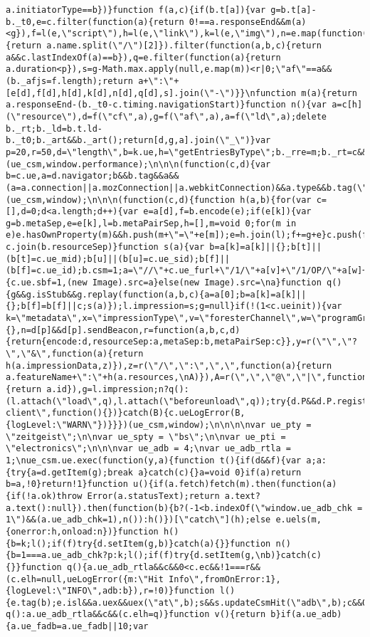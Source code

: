 \documentclass[
]{article}
\begin{document}
\begin{verbatim}
a.initiatorType==b})}function f(a,c){if(b.t[a]){var g=b.t[a]-b._t0,e=c.filter(function(a){return 0!==a.responseEnd&&m(a)<g}),f=l(e,\"script\"),h=l(e,\"link\"),k=l(e,\"img\"),n=e.map(function(a){return a.name.split(\"/\")[2]}).filter(function(a,b,c){return a&&c.lastIndexOf(a)==b}),q=e.filter(function(a){return a.duration<p}),s=g-Math.max.apply(null,e.map(m))<r|0;\"af\"==a&&(b._afjs=f.length);return a+\":\"+[e[d],f[d],h[d],k[d],n[d],q[d],s].join(\"-\")}}\nfunction m(a){return a.responseEnd-(b._t0-c.timing.navigationStart)}function n(){var a=c[h](\"resource\"),d=f(\"cf\",a),g=f(\"af\",a),a=f(\"ld\",a);delete b._rt;b._ld=b.t.ld-b._t0;b._art&&b._art();return[d,g,a].join(\"_\")}var p=20,r=50,d=\"length\",b=k.ue,h=\"getEntriesByType\";b._rre=m;b._rt=c&&c.timing&&c[h]&&n})(ue_csm,window.performance);\n\n\n(function(c,d){var b=c.ue,a=d.navigator;b&&b.tag&&a&&(a=a.connection||a.mozConnection||a.webkitConnection)&&a.type&&b.tag(\"netInfo:\"+a.type)})(ue_csm,window);\n\n\n(function(c,d){function h(a,b){for(var c=[],d=0;d<a.length;d++){var e=a[d],f=b.encode(e);if(e[k]){var g=b.metaSep,e=e[k],l=b.metaPairSep,h=[],m=void 0;for(m in e)e.hasOwnProperty(m)&&h.push(m+\"=\"+e[m]);e=h.join(l);f+=g+e}c.push(f)}return c.join(b.resourceSep)}function s(a){var b=a[k]=a[k]||{};b[t]||(b[t]=c.ue_mid);b[u]||(b[u]=c.ue_sid);b[f]||(b[f]=c.ue_id);b.csm=1;a=\"//\"+c.ue_furl+\"/1/\"+a[v]+\"/1/OP/\"+a[w]+\"/\"+a[x]+\"/\"+h([a],y);if(n)try{n.call(d[p],a)}catch(g){c.ue.sbf=1,(new Image).src=a}else(new Image).src=\na}function q(){g&&g.isStub&&g.replay(function(a,b,c){a=a[0];b=a[k]=a[k]||{};b[f]=b[f]||c;s(a)});l.impression=s;g=null}if(!(1<c.ueinit)){var k=\"metadata\",x=\"impressionType\",v=\"foresterChannel\",w=\"programGroup\",t=\"marketplaceId\",u=\"session\",f=\"requestId\",p=\"navigator\",l=c.ue||{},n=d[p]&&d[p].sendBeacon,r=function(a,b,c,d){return{encode:d,resourceSep:a,metaSep:b,metaPairSep:c}},y=r(\"\",\"?\",\"&\",function(a){return h(a.impressionData,z)}),z=r(\"/\",\":\",\",\",function(a){return a.featureName+\":\"+h(a.resources,\nA)}),A=r(\",\",\"@\",\"|\",function(a){return a.id}),g=l.impression;n?q():(l.attach(\"load\",q),l.attach(\"beforeunload\",q));try{d.P&&d.P.register&&d.P.register(\"impression-client\",function(){})}catch(B){c.ueLogError(B,{logLevel:\"WARN\"})}}})(ue_csm,window);\n\n\n\nvar ue_pty = \"zeitgeist\";\n\nvar ue_spty = \"bs\";\n\nvar ue_pti = \"electronics\";\n\n\nvar ue_adb = 4;\nvar ue_adb_rtla = 1;\nue_csm.ue.exec(function(y,a){function t(){if(d&&f){var a;a:{try{a=d.getItem(g);break a}catch(c){}a=void 0}if(a)return b=a,!0}return!1}function u(){if(a.fetch)fetch(m).then(function(a){if(!a.ok)throw Error(a.statusText);return a.text?a.text():null}).then(function(b){b?(-1<b.indexOf(\"window.ue_adb_chk = 1\")&&(a.ue_adb_chk=1),n()):h()})[\"catch\"](h);else e.uels(m,{onerror:h,onload:n})}function h(){b=k;l();if(f)try{d.setItem(g,b)}catch(a){}}function n(){b=1===a.ue_adb_chk?p:k;l();if(f)try{d.setItem(g,\nb)}catch(c){}}function q(){a.ue_adb_rtla&&c&&0<c.ec&&!1===r&&(c.elh=null,ueLogError({m:\"Hit Info\",fromOnError:1},{logLevel:\"INFO\",adb:b}),r=!0)}function l(){e.tag(b);e.isl&&a.uex&&uex(\"at\",b);s&&s.updateCsmHit(\"adb\",b);c&&0<c.ec?q():a.ue_adb_rtla&&c&&(c.elh=q)}function v(){return b}if(a.ue_adb){a.ue_fadb=a.ue_fadb||10;var 
\end{verbatim}
\end{document}
